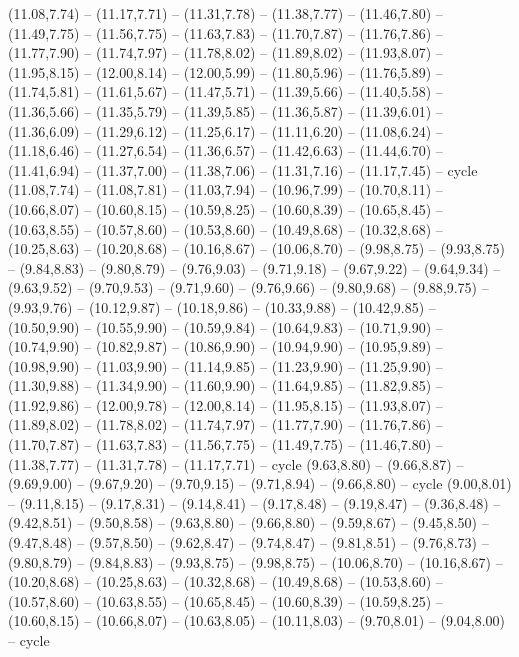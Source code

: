 \expandafter\def\csname geo:gebiet:heute-BLR\endcsname{
  (11.08,7.74) -- (11.17,7.71) -- (11.31,7.78) -- (11.38,7.77) -- (11.46,7.80) -- (11.49,7.75) -- (11.56,7.75) -- (11.63,7.83) -- (11.70,7.87) -- (11.76,7.86) -- (11.77,7.90) -- (11.74,7.97) -- (11.78,8.02) -- (11.89,8.02) -- (11.93,8.07) -- (11.95,8.15) -- (12.00,8.14) -- (12.00,5.99) -- (11.80,5.96) -- (11.76,5.89) -- (11.74,5.81) -- (11.61,5.67) -- (11.47,5.71) -- (11.39,5.66) -- (11.40,5.58) -- (11.36,5.66) -- (11.35,5.79) -- (11.39,5.85) -- (11.36,5.87) -- (11.39,6.01) -- (11.36,6.09) -- (11.29,6.12) -- (11.25,6.17) -- (11.11,6.20) -- (11.08,6.24) -- (11.18,6.46) -- (11.27,6.54) -- (11.36,6.57) -- (11.42,6.63) -- (11.44,6.70) -- (11.41,6.94) -- (11.37,7.00) -- (11.38,7.06) -- (11.31,7.16) -- (11.17,7.45) -- cycle}
\expandafter\def\csname geo:gebiet:heute-LTU\endcsname{
  (11.08,7.74) -- (11.08,7.81) -- (11.03,7.94) -- (10.96,7.99) -- (10.70,8.11) -- (10.66,8.07) -- (10.60,8.15) -- (10.59,8.25) -- (10.60,8.39) -- (10.65,8.45) -- (10.63,8.55) -- (10.57,8.60) -- (10.53,8.60) -- (10.49,8.68) -- (10.32,8.68) -- (10.25,8.63) -- (10.20,8.68) -- (10.16,8.67) -- (10.06,8.70) -- (9.98,8.75) -- (9.93,8.75) -- (9.84,8.83) -- (9.80,8.79) -- (9.76,9.03) -- (9.71,9.18) -- (9.67,9.22) -- (9.64,9.34) -- (9.63,9.52) -- (9.70,9.53) -- (9.71,9.60) -- (9.76,9.66) -- (9.80,9.68) -- (9.88,9.75) -- (9.93,9.76) -- (10.12,9.87) -- (10.18,9.86) -- (10.33,9.88) -- (10.42,9.85) -- (10.50,9.90) -- (10.55,9.90) -- (10.59,9.84) -- (10.64,9.83) -- (10.71,9.90) -- (10.74,9.90) -- (10.82,9.87) -- (10.86,9.90) -- (10.94,9.90) -- (10.95,9.89) -- (10.98,9.90) -- (11.03,9.90) -- (11.14,9.85) -- (11.23,9.90) -- (11.25,9.90) -- (11.30,9.88) -- (11.34,9.90) -- (11.60,9.90) -- (11.64,9.85) -- (11.82,9.85) -- (11.92,9.86) -- (12.00,9.78) -- (12.00,8.14) -- (11.95,8.15) -- (11.93,8.07) -- (11.89,8.02) -- (11.78,8.02) -- (11.74,7.97) -- (11.77,7.90) -- (11.76,7.86) -- (11.70,7.87) -- (11.63,7.83) -- (11.56,7.75) -- (11.49,7.75) -- (11.46,7.80) -- (11.38,7.77) -- (11.31,7.78) -- (11.17,7.71) -- cycle
  (9.63,8.80) -- (9.66,8.87) -- (9.69,9.00) -- (9.67,9.20) -- (9.70,9.15) -- (9.71,8.94) -- (9.66,8.80) -- cycle}
\expandafter\def\csname geo:gebiet:heute-RUS\endcsname{
  (9.00,8.01) -- (9.11,8.15) -- (9.17,8.31) -- (9.14,8.41) -- (9.17,8.48) -- (9.19,8.47) -- (9.36,8.48) -- (9.42,8.51) -- (9.50,8.58) -- (9.63,8.80) -- (9.66,8.80) -- (9.59,8.67) -- (9.45,8.50) -- (9.47,8.48) -- (9.57,8.50) -- (9.62,8.47) -- (9.74,8.47) -- (9.81,8.51) -- (9.76,8.73) -- (9.80,8.79) -- (9.84,8.83) -- (9.93,8.75) -- (9.98,8.75) -- (10.06,8.70) -- (10.16,8.67) -- (10.20,8.68) -- (10.25,8.63) -- (10.32,8.68) -- (10.49,8.68) -- (10.53,8.60) -- (10.57,8.60) -- (10.63,8.55) -- (10.65,8.45) -- (10.60,8.39) -- (10.59,8.25) -- (10.60,8.15) -- (10.66,8.07) -- (10.63,8.05) -- (10.11,8.03) -- (9.70,8.01) -- (9.04,8.00) -- cycle}
